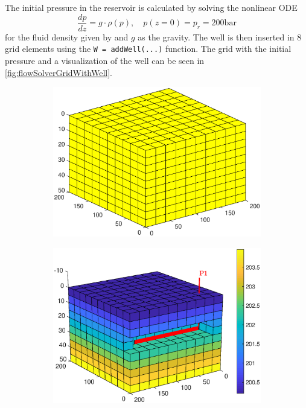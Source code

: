 The initial pressure in the reservoir is calculated by solving the nonlinear ODE
\begin{equation*}
    \frac{dp}{dz} = g\cdot \rho(p), \quad p(z = 0) = p_r = 200\text{bar} 
\end{equation*}  
for the fluid density given by  and $g$ as the gravity. The well is then inserted in 8 grid elements using the \texttt{W = addWell(...)} function. The grid with the initial pressure and a visualization of the well can be seen in \autoref{fig:flowSolverGridWithWell}.
\begin{figure}[H]
    \centering
    \begin{subfigure}[t]{0.48\textwidth}
        \centering
        \includegraphics[width = \textwidth]{figures/flowSolver_grid.eps}
        \caption{}
        \label{fig:flowSolverGrid}
    \end{subfigure}
    \hfill
    \begin{subfigure}[t]{0.48\textwidth}
        \centering
        \includegraphics[width = \textwidth]{figures/flowSolver_gridWithWell.eps}

\end{subfigure}
\end{figure}

